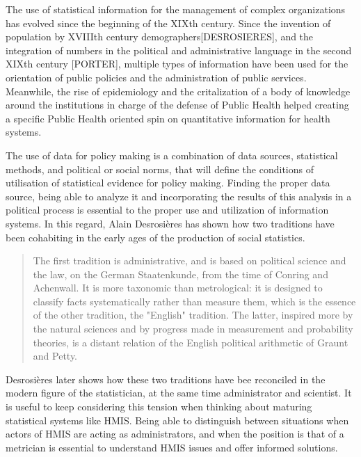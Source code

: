 \documentclass[a4paper,11pt,draft,twoside]{article}
\begin{document}
The use of statistical information for the management of complex organizations has evolved since the beginning of the XIXth century. Since the invention of population by XVIIIth century demographers[DESROSIERES], and the integration of numbers in the political and administrative language in the second XIXth century [PORTER], multiple types of information have been used for the orientation of public policies and the administration of public services. Meanwhile, the rise of epidemiology and the critalization of a body of knowledge around the institutions in charge of the defense of Public Health helped creating a specific Public Health oriented spin on quantitative information for health systems.

The use of data for policy making is a combination of data sources, statistical methods, and political or social norms, that will define the conditions of utilisation of statistical evidence for policy making. Finding the proper data source, being able to analyze it and incorporating the results of this analysis in a political process is essential to the proper use and utilization of information systems. In this regard, Alain Desrosières has shown how two traditions have been cohabiting in the early ages of the production of social statistics\cite{admin_savant}.



\begin{quote}
The first tradition is administrative, and is based on political science and the law, on the German Staatenkunde, from the time of Conring and Achenwall. It is more taxonomic than metrological: it is designed to classify facts systematically rather than measure them, which is the essence of the other tradition, the "English" tradition. The latter, inspired more by the natural sciences and by progress made in measurement and probability theories, is a distant relation of the English political arithmetic of Graunt and Petty.
\end{quote}

Desrosières later shows how these two traditions have bee reconciled in the modern figure of the statistician, at the same time administrator and scientist. It is useful to keep considering this tension when thinking about maturing statistical systems like HMIS. Being able to distinguish between situations when actors of HMIS are acting as administrators, and when the position is that of a metrician is essential to understand HMIS issues and offer informed solutions.
\end{document}
